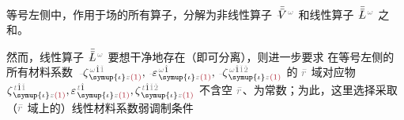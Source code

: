  等号左侧中，作用于场的所有算子，分解为非线性算子 $\Xint{\mathcolor{gray}{-}}{21}{\bar{\bar{V}}}^{\;\! \mathcolor{gray}{\omega}}$ 和线性算子 $\Xint{\mathcolor{gray}{-}}{30}{\bar{\bar{L}}}^{\;\! \mathcolor{gray}{\omega}}$ 之和。

然而，线性算子 $\Xint{\mathcolor{gray}{-}}{30}{\bar{\bar{L}}}^{\;\! \mathcolor{gray}{\omega}}$ 要想干净地存在（即可分离），则进一步要求  在等号左侧的所有材料系数 $\Xint{\begin{smallmatrix} ~ \\ {}^{}_{\mathcolor{gray}{-}} \\ ~ \end{smallmatrix}}{12}{\zeta}^{\;\! \mathcolor{gray}{\omega} \hat{1} \mathcolor{gray}{\check{1}}}_{\;\! \symup{\iota} \mathcolor{gray}{z} \textcolor{Maroon}{(1)}}, \Xint{\begin{smallmatrix} ~ \\ {}^{}_{\mathcolor{gray}{-}} \\ ~ \end{smallmatrix}}{16}{\varepsilon}^{\;\! \mathcolor{gray}{\omega} \hat{1}}_{\;\! \symup{\iota} \mathcolor{gray}{z} \textcolor{Maroon}{(1)}}, \Xint{\begin{smallmatrix} ~ \\ {}^{}_{\mathcolor{gray}{-}} \\ ~ \end{smallmatrix}}{12}{\zeta}^{\;\! \mathcolor{gray}{\omega} \hat{1} \mathcolor{gray}{\check{1} \check{2}}}_{\;\! \symup{\iota} \mathcolor{gray}{z} \textcolor{Maroon}{(1)}}$ 的 $\mathcolor{gray}{\bar{r}}$ 域对应物 $\zeta^{\;\! \mathcolor{gray}{t} \hat{1} \mathcolor{gray}{\check{1}}}_{\;\! \symup{\iota} \mathcolor{gray}{z} \textcolor{Maroon}{(1)}}, \varepsilon^{\;\! \mathcolor{gray}{t} \hat{1}}_{\;\! \symup{\iota} \mathcolor{gray}{z} \textcolor{Maroon}{(1)}}, \zeta^{\;\! \mathcolor{gray}{t} \hat{1} \mathcolor{gray}{\check{1} \check{2}}}_{\;\! \symup{\iota} \mathcolor{gray}{z} \textcolor{Maroon}{(1)}}$ 不含空 $\mathcolor{gray}{\bar{r}}$、为常数；为此，这里选择采取（$\mathcolor{gray}{\bar{r}}$ 域上的）线性材料系数弱调制条件
